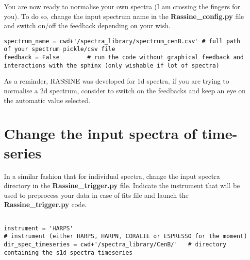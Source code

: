 \documentclass{article}
\begin{document}
You are now ready to normalise your own spectra (I am crossing the fingers for you). To do so, change the input spectrum name in the \textbf{Rassine\_config.py} file and switch on/off the feedback depending on your wish. 

\begin{lstlisting}
spectrum_name = cwd+'/spectra_library/spectrum_cenB.csv' # full path of your spectrum pickle/csv file
feedback = False        # run the code without graphical feedback and interactions with the sphinx (only wishable if lot of spectra)     
\end{lstlisting}

As a reminder, RASSINE was developed for 1d spectra, if you are trying to normalise a 2d spectrum, consider to switch on the feedbacks and keep an eye on the automatic value selected.

\section{Change the input spectra of time-series}

In a similar fashion that for individual spectra, change the input spectra directory in the \textbf{Rassine\_trigger.py} file. Indicate the instrument that will be used to preprocess your data in case of fits file and launch the \textbf{Rassine\_trigger.py } code.

\begin{lstlisting}

instrument = 'HARPS'                                                     # instrument (either HARPS, HARPN, CORALIE or ESPRESSO for the moment)
dir_spec_timeseries = cwd+'/spectra_library/CenB/'   # directory containing the s1d spectra timeseries
 
\end{lstlisting}
\end{document}
